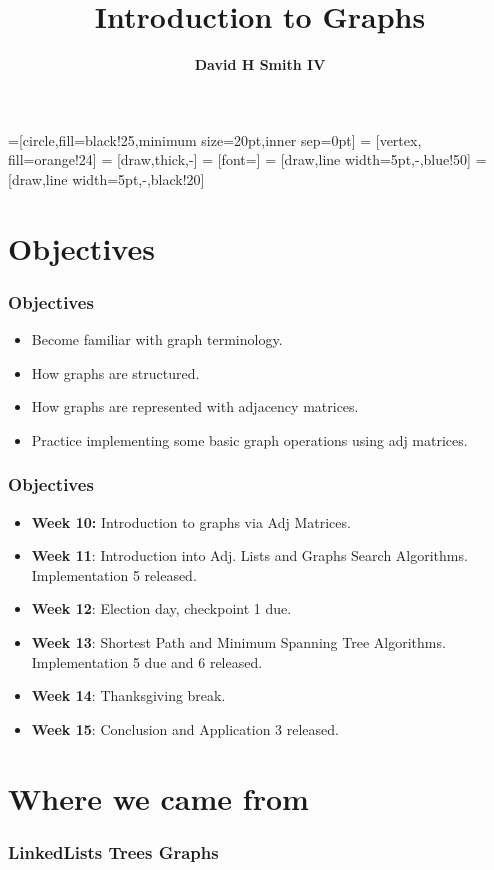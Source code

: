 \documentclass{beamer}
\title{\textbf{Introduction to Graphs}}
\author{\textbf{David H Smith IV}}
\institute[\textbf{UIUC}]{\textbf{University of Illinois Urbana-Champaign}}
\date{\textbf{}}
\begin{document}

=[circle,fill=black!25,minimum size=20pt,inner sep=0pt]
 = [vertex, fill=orange!24]
 = [draw,thick,-]
 = [font=\small]
 = [draw,line width=5pt,-,blue!50]
 = [draw,line width=5pt,-,black!20]


\frame{\titlepage}

\section{Objectives}
\begin{frame}
	\frametitle{Objectives}
    \centering
    \begin{itemize}
        \item Become familiar with graph terminology.
        \item How graphs are structured.
        \item How graphs are represented with adjacency matrices.
        \item Practice implementing some basic graph operations using adj matrices.
    \end{itemize}
\end{frame}

\begin{frame}
	\frametitle{Objectives}
    \centering
    \begin{itemize}
		\item \textbf{Week 10:} Introduction to graphs via Adj Matrices.
		\item \textbf{Week 11}: Introduction into Adj. Lists and Graphs Search Algorithms. Implementation 5 released.
		\item \textbf{Week 12}: Election day, checkpoint 1 due.
		\item \textbf{Week 13}: Shortest Path and Minimum Spanning Tree Algorithms. Implementation 5 due and 6 released.
		\item \textbf{Week 14}: Thanksgiving break.
		\item \textbf{Week 15}: Conclusion and Application 3 released. 
    \end{itemize}
\end{frame}

\section{Where we came from}
\begin{frame}[fragile]
	\frametitle{LinkedLists \textrightarrow Trees \textrightarrow Graphs}
    \begin{minipage}{0.32\textwidth}
		\centering
		
    \end{minipage}
    \begin{minipage}{0.32\textwidth}
		\centering
		
    \end{minipage}
    \begin{minipage}{0.32\textwidth}
		\centering
		
    \end{minipage}
\end{frame}
\end{document}
